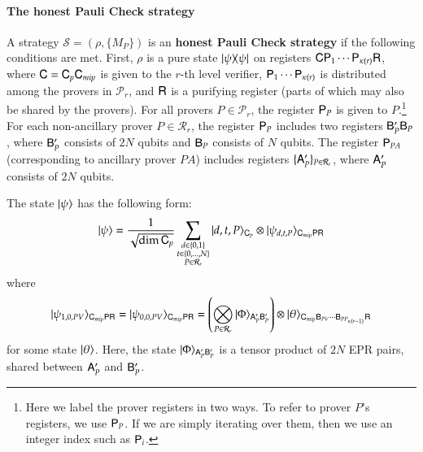 \paragraph{The honest Pauli Check strategy}
A strategy $\mathcal{S} = (\rho,\{ M_P \})$ is an \textbf{honest Pauli Check strategy} if the following conditions are met. First, $\rho$ is a pure state $|\psi\rangle\! \langle \psi|$ on registers ${\mathsf{C}} {\mathsf{P}}_1 \cdots {\mathsf{P}}_{\kappa(r)} {\mathsf{R}}$, where ${\mathsf{C}} = {\mathsf{C}}_p {\mathsf{C}}_{mip}$ is given to the $r$-th level verifier, ${\mathsf{P}}_1 \cdots {\mathsf{P}}_{\kappa(r)}$ is distributed among the provers in $\mathcal{P}_r$, and ${\mathsf{R}}$ is a purifying register (parts of which may also be shared by the provers). For all provers $P \in \mathcal{P}_r$, the register ${\mathsf{P}}_P$ is given to $P$.\footnote{Here we label the prover registers in two ways. To refer to prover $P$'s registers, we use ${\mathsf{P}}_P$. If we are simply iterating over them, then we use an integer index such as ${\mathsf{P}}_i$.}  For each non-ancillary prover $P \in \mathcal{R}_r$, the register ${\mathsf{P}}_P$ includes two registers ${\mathsf{B}}_P' {\mathsf{B}}_P$, where ${\mathsf{B}}_P'$ consists of $2N$ qubits and ${\mathsf{B}}_P$ consists of $N$ qubits. The register ${\mathsf{P}}_{PA}$ (corresponding to ancillary prover $PA$) includes registers $\{ {\mathsf{A}}_P' \}_{P \in \mathcal{R}_r}$, where ${\mathsf{A}}_P'$ consists of $2N$ qubits.

The state $|\psi\rangle$ has the following form:
\begin{equation}
	\ket{\psi} = \frac{1}{\sqrt{\dim \sC_p}} \sum_{\substack{d \in \set{0,1} \\ t \in \set{0,\ldots,N} \\ P \in \mathcal{R}_r}} \ket{d,t,P}_{\sC_p} \otimes \ket{\psi_{d,t,P}}_{\sC_{mip} \sP \sR}
	\label{eq:honest-psi}
\end{equation}
where 
\[
	|\psi_{1,0,PV}\rangle_{{\mathsf{C}}_{mip} {\mathsf{P}} {\mathsf{R}}} = |\psi_{0,0,PV}\rangle_{{\mathsf{C}}_{mip} {\mathsf{P}} {\mathsf{R}}} = \left( \bigotimes_{P \in \mathcal{R}_r} |\Phi\rangle_{{\mathsf{A}}_P' {\mathsf{B}}_P'}\right) \otimes |\theta\rangle_{{\mathsf{C}}_{mip} {\mathsf{B}}_{PV} \cdots {\mathsf{B}}_{PP_{\kappa(r-1)}} {\mathsf{R}}}
\]
for some state $|\theta\rangle$. Here, the state $|\Phi\rangle_{{\mathsf{A}}_P' {\mathsf{B}}_P'}$ is a tensor product of $2N$ EPR pairs, shared between ${\mathsf{A}}_P'$ and ${\mathsf{B}}_P'$. 

